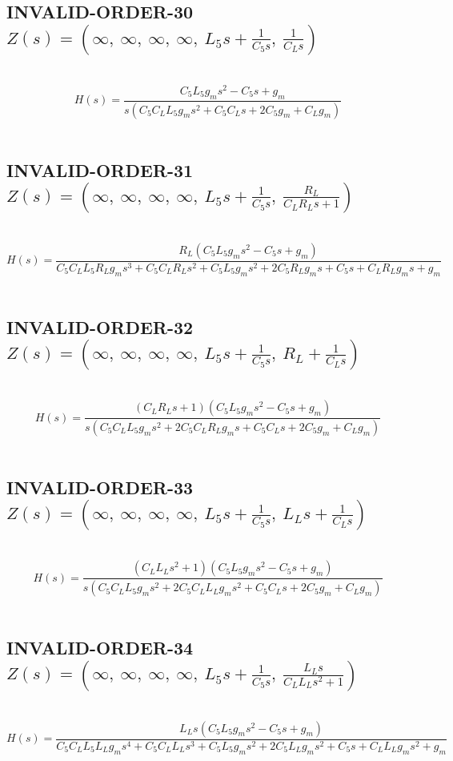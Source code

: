 \documentclass{article}
\begin{document}
\subsection{INVALID-ORDER-30 $Z(s) = \left( \infty, \  \infty, \  \infty, \  \infty, \  L_{5} s + \frac{1}{C_{5} s}, \  \frac{1}{C_{L} s}\right)$ } \ 
\textbf{\[H(s) = \frac{C_{5} L_{5} g_{m} s^{2} - C_{5} s + g_{m}}{s \left(C_{5} C_{L} L_{5} g_{m} s^{2} + C_{5} C_{L} s + 2 C_{5} g_{m} + C_{L} g_{m}\right)}\] } \ 
\subsection{INVALID-ORDER-31 $Z(s) = \left( \infty, \  \infty, \  \infty, \  \infty, \  L_{5} s + \frac{1}{C_{5} s}, \  \frac{R_{L}}{C_{L} R_{L} s + 1}\right)$ } \ 
\textbf{\[H(s) = \frac{R_{L} \left(C_{5} L_{5} g_{m} s^{2} - C_{5} s + g_{m}\right)}{C_{5} C_{L} L_{5} R_{L} g_{m} s^{3} + C_{5} C_{L} R_{L} s^{2} + C_{5} L_{5} g_{m} s^{2} + 2 C_{5} R_{L} g_{m} s + C_{5} s + C_{L} R_{L} g_{m} s + g_{m}}\] } \ 
\subsection{INVALID-ORDER-32 $Z(s) = \left( \infty, \  \infty, \  \infty, \  \infty, \  L_{5} s + \frac{1}{C_{5} s}, \  R_{L} + \frac{1}{C_{L} s}\right)$ } \ 
\textbf{\[H(s) = \frac{\left(C_{L} R_{L} s + 1\right) \left(C_{5} L_{5} g_{m} s^{2} - C_{5} s + g_{m}\right)}{s \left(C_{5} C_{L} L_{5} g_{m} s^{2} + 2 C_{5} C_{L} R_{L} g_{m} s + C_{5} C_{L} s + 2 C_{5} g_{m} + C_{L} g_{m}\right)}\] } \ 
\subsection{INVALID-ORDER-33 $Z(s) = \left( \infty, \  \infty, \  \infty, \  \infty, \  L_{5} s + \frac{1}{C_{5} s}, \  L_{L} s + \frac{1}{C_{L} s}\right)$ } \ 
\textbf{\[H(s) = \frac{\left(C_{L} L_{L} s^{2} + 1\right) \left(C_{5} L_{5} g_{m} s^{2} - C_{5} s + g_{m}\right)}{s \left(C_{5} C_{L} L_{5} g_{m} s^{2} + 2 C_{5} C_{L} L_{L} g_{m} s^{2} + C_{5} C_{L} s + 2 C_{5} g_{m} + C_{L} g_{m}\right)}\] } \ 
\subsection{INVALID-ORDER-34 $Z(s) = \left( \infty, \  \infty, \  \infty, \  \infty, \  L_{5} s + \frac{1}{C_{5} s}, \  \frac{L_{L} s}{C_{L} L_{L} s^{2} + 1}\right)$ } \ 
\textbf{\[H(s) = \frac{L_{L} s \left(C_{5} L_{5} g_{m} s^{2} - C_{5} s + g_{m}\right)}{C_{5} C_{L} L_{5} L_{L} g_{m} s^{4} + C_{5} C_{L} L_{L} s^{3} + C_{5} L_{5} g_{m} s^{2} + 2 C_{5} L_{L} g_{m} s^{2} + C_{5} s + C_{L} L_{L} g_{m} s^{2} + g_{m}}\] } \ 
\end{document}
